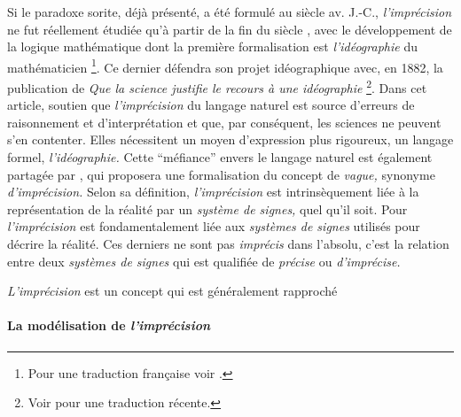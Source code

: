 Si le paradoxe sorite, déjà présenté, a été formulé au
 siècle av. J.-C., \emph{l'imprécision} ne fut
réellement étudiée qu'à partir de la fin du  siècle
\autocite{Williamson1994}, avec le développement de la logique
mathématique dont la première formalisation est \emph{l'idéographie}
du mathématicien \textcite{Frege1879} \footnote{Pour une traduction
  française voir \autocite{Frege1999}.}. Ce dernier défendra son
projet idéographique avec, en 1882, la publication de \emph{Que la
  science justifie le recours à une idéographie} \autocite{Frege1882}
\footnote{Voir \autocite{Frege2019} pour une traduction
  récente.}. Dans cet article,  soutien que
\emph{l'imprécision} du langage naturel est source d'erreurs de
raisonnement et d'interprétation et que, par conséquent, les sciences
ne peuvent s'en contenter. Elles nécessitent un moyen d'expression
plus rigoureux, un langage formel, \emph{l'idéographie.} Cette
\enquote{méfiance} envers le langage naturel est également partagée
par \textcite{Russell1923}, qui proposera une formalisation du concept
de \emph{vague,} synonyme \emph{d'imprécision.} Selon sa définition,
\emph{l'imprécision} est intrinsèquement liée à la représentation de
la réalité par un \emph{système de signes,} quel qu'il soit. Pour
\textcite{Russell1923} \emph{l'imprécision} est fondamentalement liée
aux \emph{systèmes de signes} utilisés pour décrire la réalité. Ces
derniers ne sont pas \emph{imprécis} dans l'absolu, c'est la relation
entre deux \emph{systèmes de signes} qui est qualifiée de
\emph{précise} ou \emph{d'imprécise.}

\emph{L'imprécision} est un concept qui est généralement rapproché 

\autocite{Bunel2020}

\paragraph{La modélisation de \emph{l'imprécision}}

